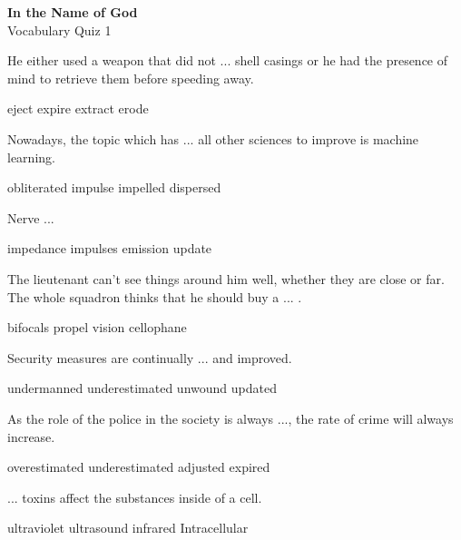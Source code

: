 \documentclass{exam}
\begin{document}
\begin{center}
\textbf{In the Name of God}\\ 
Vocabulary Quiz 1
\end{center}
\vspace{5mm}
\begin{questions}


\question He either used a weapon that did not ... shell casings or he had the presence of mind to retrieve them before speeding away.\\
\begin{oneparchoices}
\correctchoice eject
\choice expire
\choice extract
\choice erode
\end{oneparchoices}


\question Nowadays, the topic which has ... all other sciences to improve is machine learning.\\
\begin{oneparchoices}
 
 \choice obliterated
 \choice impulse
\correctchoice impelled
 \choice dispersed
\end{oneparchoices}

\question Nerve ...\\
\begin{oneparchoices}
\choice impedance 
\correctchoice impulses
\choice emission 
\choice update
\end{oneparchoices}


\question The lieutenant can't see things around him well, whether they are close or far. The whole squadron thinks that he should buy a ... .\\
\begin{oneparchoices}
 \correctchoice bifocals
 \choice propel
 \choice vision
 \choice cellophane
\end{oneparchoices}

\question Security measures are continually ... and improved.\\
\begin{oneparchoices}
\choice undermanned
\choice underestimated
\choice unwound
\correctchoice updated
\end{oneparchoices}

\question As the role of the police in the society is always ..., the rate of crime will always increase.\\
\begin{oneparchoices}
\choice overestimated
 \correctchoice underestimated
 \choice adjusted
 \choice expired 
\end{oneparchoices}
\question ... toxins affect the substances inside of a cell.\\
\begin{oneparchoices}
\choice ultraviolet
\choice ultrasound
\choice infrared
\correctchoice Intracellular
\end{oneparchoices}


\end{questions}
\end{document}
